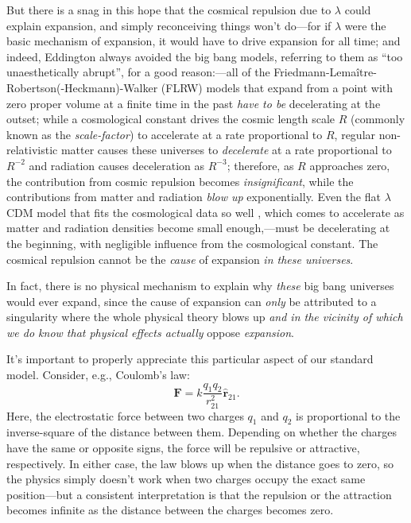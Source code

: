\documentclass[12 pt]{article}
\begin{document}
But there is a snag in this hope that the cosmical repulsion due to $\lambda$ could explain expansion, and simply reconceiving things won't do---for if $\lambda$ were the basic mechanism of expansion, it would have to drive expansion for all time; and indeed, Eddington always avoided the big bang models, referring to them as ``too unaesthetically abrupt'', for a good reason:---all of the Friedmann-Lema\^{i}tre-Robertson(-Heckmann)-Walker (FLRW) models that expand from a point with zero proper volume at a finite time in the past \textit{have to be} decelerating at the outset; while a cosmological constant drives the cosmic length scale $R$ (commonly known as the \textit{scale-factor}) to accelerate at a rate proportional to $R$, regular non-relativistic matter causes these universes to \textit{decelerate} at a rate proportional to $R^{-2}$ and radiation causes deceleration as $R^{-3}$; therefore, as $R$ approaches zero, the contribution from cosmic repulsion becomes \textit{insignificant}, while the contributions from matter and radiation \textit{blow up} exponentially. Even the flat $\lambda$CDM model that fits the cosmological data so well \citep{Hinshaw2013,Ade2013}, which comes to accelerate as matter and radiation densities become small enough,---must be decelerating at the beginning, with negligible influence from the cosmological constant. The cosmical repulsion cannot be the \textit{cause} of expansion \textit{in these universes}.

In fact, there is no physical mechanism to explain why \textit{these} big bang universes would ever expand, since the cause of expansion can \textit{only} be attributed to a singularity where the whole physical theory blows up \textit{and in the vicinity of which we do know that physical effects actually} oppose \textit{expansion}. 

It's important to properly appreciate this particular aspect of our standard model. Consider, e.g., Coulomb's law: 
\begin{equation}
\mathbf{F}=k\frac{q_1q_2}{r_{21}^2}\hat{\mathbf{r}}_{21}.
\end{equation}
Here, the electrostatic force between two charges $q_1$ and $q_2$ is proportional to the inverse-square of the distance between them. Depending on whether the charges have the same or opposite signs, the force will be repulsive or attractive, respectively. In either case, the law blows up when the distance goes to zero, so the physics simply doesn't work when two charges occupy the exact same position---but a consistent interpretation is that the repulsion or the attraction becomes infinite as the distance between the charges becomes zero.
\end{document}
